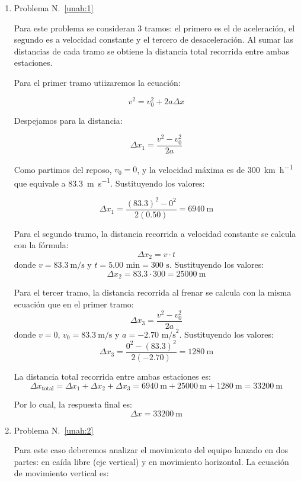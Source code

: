 \documentclass{article}
\begin{document}
\begin{enumerate}
    \item Problema N.~\ref{unah:1}
    
    Para este problema se consideran 3 tramos: el primero es el de aceleración, el segundo es a velocidad constante y el tercero de desaceleración. Al sumar las distancias de cada tramo se obtiene la distancia total recorrida entre ambas estaciones.

    Para el primer tramo utiizaremos la ecuación:

    \[
        v^2 = v_0^2 + 2 a \Delta x
    \]

    Despejamos para la distancia:

    \[
        \Delta x_1 = \frac{v^2 - v_0^2}{2 a}
    \]

    Como partimos del reposo, $v_0 = 0$, y la velocidad máxima es de \SI{300}{\kilo\meter\per\hour} que equivale a \SI{83.3}{\meter\per\second}. Sustituyendo los valores:

    \[
        \Delta x_1 = \frac{(83.3)^2 - 0^2}{2 (0.50)} = \SI{6940}{\meter}
    \]

    Para el segundo tramo, la distancia recorrida a velocidad constante se calcula con la fórmula:
    \[
        \Delta x_2 = v \cdot t
    \]
    donde $v = \SI{83.3}{\meter\per\second}$ y $t = 5.00 \text{ min} = 300 \text{ s}$. Sustituyendo los valores:
    \[
        \Delta x_2 = 83.3 \cdot 300 = \SI{25000}{\meter}
    \]

    Para el tercer tramo, la distancia recorrida al frenar se calcula con la misma ecuación que en el primer tramo:
    \[
        \Delta x_3 = \frac{v^2 - v_0^2}{2 a}
    \]
    donde $v = 0$, $v_0 = \SI{83.3}{\meter\per\second}$ y $a = -2.70 \text{ m/s}^2$. Sustituyendo los valores:
    \[
        \Delta x_3 = \frac{0^2 - (83.3)^2}{2 (-2.70)} = \SI{1280}{\meter}
    \]

    La distancia total recorrida entre ambas estaciones es:
    \[
        \Delta x_{\text{total}} = \Delta x_1 + \Delta x_2 + \Delta x_3 = \SI{6940}{\meter} + \SI{25000}{\meter} + \SI{1280}{\meter} = \SI{33200}{\meter}
    \]

    Por lo cual, la respuesta final es:
    \[
        \boxed{\Delta x = \SI{33200}{\meter}}
    \]

    \item Problema N.~\ref{unah:2}
    
    Para este caso deberemos analizar el movimiento del equipo lanzado en dos partes: en caída libre (eje vertical) y en movimiento horizontal. La ecuación de movimiento vertical es:


\end{enumerate}
\end{document}
